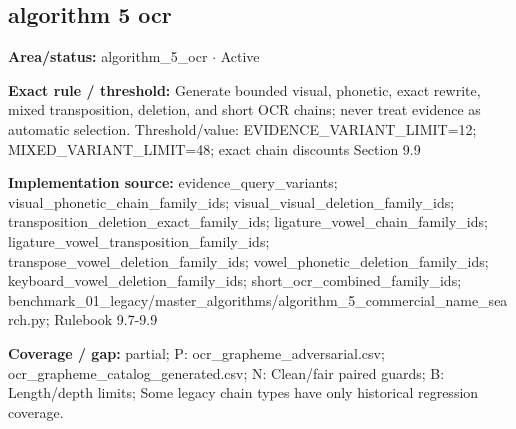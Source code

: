 \subsection*{algorithm 5 ocr}
\begin{tcolorbox}[enhanced,breakable,colback=white,colframe=Muted!45,boxrule=0.45pt,arc=1.5pt,left=6pt,right=6pt,top=5pt,bottom=5pt,title={\texttt{A5-CHAINS-13}},title after break={\texttt{A5-CHAINS-13}\ (continued)},fonttitle=\headingfont\bfseries\color{Navy},coltitle=Navy]
\textbf{Area/status:} algorithm\_\allowbreak{}5\_\allowbreak{}ocr $\boldsymbol{\cdot}$ Active\par
\smallskip
\textbf{Exact rule / threshold:} Generate bounded visual, phonetic, exact rewrite, mixed transposition, deletion, and short OCR chains; never treat evidence as automatic selection. Threshold/\allowbreak{}value: EVIDENCE\_\allowbreak{}VARIANT\_\allowbreak{}LIMIT=12; MIXED\_\allowbreak{}VARIANT\_\allowbreak{}LIMIT=48; exact chain discounts Section 9.9\par
\smallskip
\textbf{Implementation source:} evidence\_\allowbreak{}query\_\allowbreak{}variants; visual\_\allowbreak{}phonetic\_\allowbreak{}chain\_\allowbreak{}family\_\allowbreak{}ids; visual\_\allowbreak{}visual\_\allowbreak{}deletion\_\allowbreak{}family\_\allowbreak{}ids; transposition\_\allowbreak{}deletion\_\allowbreak{}exact\_\allowbreak{}family\_\allowbreak{}ids; ligature\_\allowbreak{}vowel\_\allowbreak{}chain\_\allowbreak{}family\_\allowbreak{}ids; ligature\_\allowbreak{}vowel\_\allowbreak{}transposition\_\allowbreak{}family\_\allowbreak{}ids; transpose\_\allowbreak{}vowel\_\allowbreak{}deletion\_\allowbreak{}family\_\allowbreak{}ids; vowel\_\allowbreak{}phonetic\_\allowbreak{}deletion\_\allowbreak{}family\_\allowbreak{}ids; keyboard\_\allowbreak{}vowel\_\allowbreak{}deletion\_\allowbreak{}family\_\allowbreak{}ids; short\_\allowbreak{}ocr\_\allowbreak{}combined\_\allowbreak{}family\_\allowbreak{}ids; benchmark\_\allowbreak{}01\_\allowbreak{}legacy/\allowbreak{}master\_\allowbreak{}algorithms/\allowbreak{}algorithm\_\allowbreak{}5\_\allowbreak{}commercial\_\allowbreak{}name\_\allowbreak{}search.py; Rulebook 9.7-9.9\par
\smallskip
\textbf{Coverage / gap:} partial; P: ocr\_\allowbreak{}grapheme\_\allowbreak{}adversarial.csv; ocr\_\allowbreak{}grapheme\_\allowbreak{}catalog\_\allowbreak{}generated.csv; N: Clean/\allowbreak{}fair paired guards; B: Length/\allowbreak{}depth limits; Some legacy chain types have only historical regression coverage.
\end{tcolorbox}
\medskip
